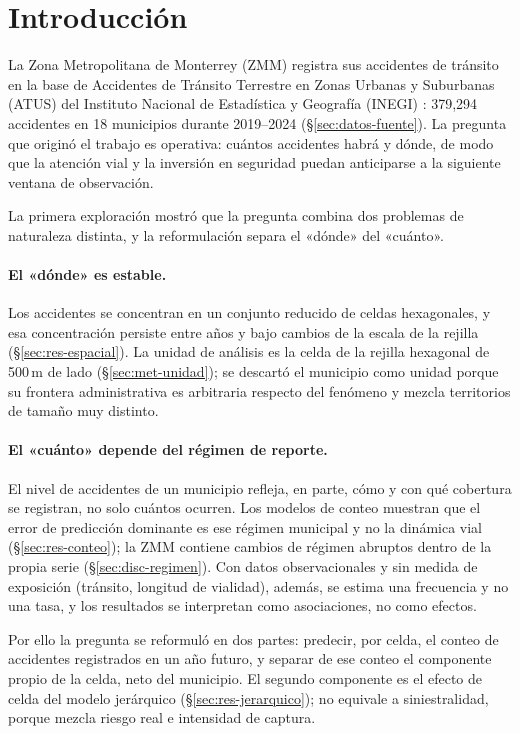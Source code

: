 \section{Introducción}\label{sec:introduccion}

La Zona Metropolitana de Monterrey (ZMM) registra sus accidentes de tránsito en
la base de Accidentes de Tránsito Terrestre en Zonas Urbanas y Suburbanas (ATUS)
del Instituto Nacional de Estadística y Geografía (INEGI) \parencite{inegi_atus}:
379,294 accidentes en 18 municipios durante 2019--2024 (§\ref{sec:datos-fuente}).
La pregunta que originó el trabajo es operativa: cuántos accidentes habrá y
dónde, de modo que la atención vial y la inversión en seguridad puedan
anticiparse a la siguiente ventana de observación.

La primera exploración mostró que la pregunta combina dos problemas de
naturaleza distinta, y la reformulación separa el «dónde» del «cuánto».

\paragraph{El «dónde» es estable.} Los accidentes se concentran en un conjunto
reducido de celdas hexagonales, y esa concentración persiste entre años y bajo
cambios de la escala de la rejilla (§\ref{sec:res-espacial}). La unidad de
análisis es la celda de la rejilla hexagonal de 500\,m de lado
(§\ref{sec:met-unidad}); se descartó el municipio como unidad porque su frontera
administrativa es arbitraria respecto del fenómeno y mezcla territorios de
tamaño muy distinto.

\paragraph{El «cuánto» depende del régimen de reporte.} El nivel de accidentes
de un municipio refleja, en parte, cómo y con qué cobertura se registran, no solo
cuántos ocurren. Los modelos de conteo muestran que el error de predicción
dominante es ese régimen municipal y no la dinámica vial
(§\ref{sec:res-conteo}); la ZMM contiene cambios de régimen abruptos dentro de
la propia serie (§\ref{sec:disc-regimen}). Con datos observacionales y sin
medida de exposición (tránsito, longitud de vialidad), además, se estima una
frecuencia y no una tasa, y los resultados se interpretan como asociaciones, no
como efectos.

Por ello la pregunta se reformuló en dos partes: predecir, por celda, el conteo
de accidentes registrados en un año futuro, y separar de ese conteo el
componente propio de la celda, neto del municipio. El segundo componente es el
efecto de celda del modelo jerárquico (§\ref{sec:res-jerarquico}); no equivale a
siniestralidad, porque mezcla riesgo real e intensidad de captura.

